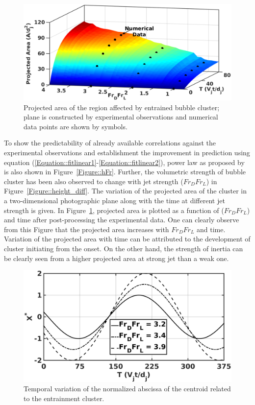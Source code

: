\begin{figure}
	\centering
	\includegraphics[width=\linewidth]{chapters/jetPool/Figure16}
	\caption{Projected area of the region affected by entrained bubble cluster; plane is constructed by experimental observations and numerical data points are shown by symbols.}
	\label{Figure::area}
\end{figure}
To show the predictability of already available correlations against the experimental observations and establishment the improvement in prediction using equation (\ref{Equation::fitlinear1}-\ref{Equation::fitlinear2}), power law as proposed by \citet{ohkawa1986some} is also shown in Figure~\ref{Figure::hFr}.
Further, the volumetric strength of bubble cluster has been also observed to change with jet strength ($Fr_DFr_L$) in Figure~\ref{Figure::height_diff}. The variation of the projected area of the cluster in a two-dimensional photographic plane along with the time at different jet strength is given. In Figure~\ref{Figure::area}, projected area is plotted as a function of ($Fr_DFr_L$) and time after post-processing the experimental data. One can clearly observe from this Figure that the projected area increases with $Fr_DFr_L$ and time. Variation of the projected area with time can be attributed to the development of cluster initiating from the onset. On the other hand, the strength of inertia can be clearly seen from a higher projected area at strong jet than a weak one.
\begin{figure}
	\centering
	\includegraphics[width=\linewidth]{chapters/jetPool/Figure17}
	\caption{Temporal variation of the normalized abscissa of the centroid related to the entrainment cluster.}
	\label{figure::solution}
\end{figure}
